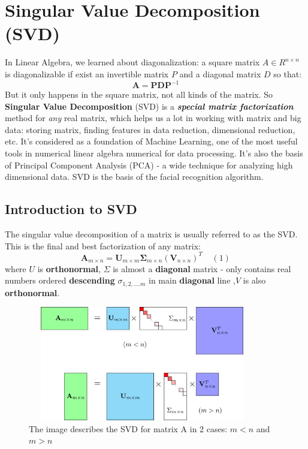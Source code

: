 \documentclass[a4paper, 12pt]{report}
\begin{document}
\newpage
\chapter{\Large Singular Value Decomposition (SVD)}
\indent \par In Linear Algebra, we learned about diagonalization: a square matrix $A \in R^{n\times n}$ is diagonalizable if exist an invertible matrix $P$ and a diagonal matrix $D$ so that:
 $$ \mathbf{A} = \mathbf{P} \mathbf{D} \mathbf{P}^{-1} $$
But it only happens in the square matrix, not all kinds of the matrix. So \textbf{Singular Value Decomposition} (SVD) is a \textbf{\textit{special matrix factorization}} method for \textit{any} real matrix, which helps us a lot in working with matrix and big data: storing matrix, finding features in data reduction, dimensional reduction, etc. It's considered as a foundation of Machine Learning, one of the most useful tools in numerical linear algebra numerical for data processing. It's also the basis of Principal Component Analysis (PCA) - a wide technique for analyzing high dimensional data. SVD is the basis of the facial recognition algorithm.
\section{Introduction to SVD}
The singular value decomposition of a matrix is usually referred to as the SVD.
This is the final and best factorization of any matrix:
$$\mathbf{A}_{m \times n} = \mathbf{U}_{m \times m}\mathbf{\Sigma}_{m \times n} (\mathbf{V}_{n \times n})^T  ~~~~~(1)$$
where $U$ is \textbf{orthonormal},  $\Sigma$ is almost a \textbf{diagonal} matrix - only contains real numbers ordered \textbf{descending} $\sigma_{1,2,....m}$ in main \textbf{diagonal} line ,$V$ is also \textbf{orthonormal}.\\

\begin{figure}[H]
    \center
    \includegraphics[width=10cm,height=5cm]{svd.png}
    \caption{The image describes the SVD for matrix A in 2 cases: $m < n $ and $m > n$}
\end{figure}
\end{document}
